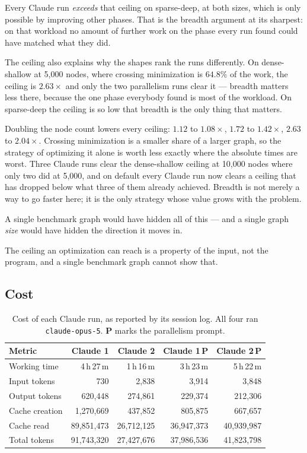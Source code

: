 Every Claude run \emph{exceeds} that ceiling on sparse-deep, at both sizes,
which is only possible by improving other phases. That is the breadth argument
at its sharpest: on that workload no amount of further work on the phase every
run found could have matched what they did.

The ceiling also explains why the shapes rank the runs differently. On
dense-shallow at 5{,}000 nodes, where crossing minimization is $64.8\%$ of the
work, the ceiling is $2.63\times$ and only the two parallelism runs clear it ---
breadth matters less there, because the one phase everybody found is most of the
workload. On sparse-deep the ceiling is so low that breadth is the only thing
that matters.

Doubling the node count lowers every ceiling: $1.12$ to $1.08\times$, $1.72$ to
$1.42\times$, $2.63$ to $2.04\times$. Crossing minimization is a smaller share
of a larger graph, so the strategy of optimizing it alone is worth less exactly
where the absolute times are worst. Three Claude runs clear the dense-shallow
ceiling at 10{,}000 nodes where only two did at 5{,}000, and on default every
Claude run now clears a ceiling that has dropped below what three of them
already achieved. Breadth is not merely a way to go faster here; it is the only
strategy whose value grows with the problem.

A single benchmark graph would have hidden all of this --- and a single graph
\emph{size} would have hidden the direction it moves in.

The ceiling an optimization can reach is a property of the input, not the
program, and a single benchmark graph cannot show that.

\subsection{Cost}

\begin{table}[H]
\centering
\caption{Cost of each Claude run, as reported by its session log. All four ran
\texttt{claude-opus-5}. \textbf{P} marks the parallelism prompt.}
\label{tab:cost-claude}
\small
\begin{tabular}{lrrrr}
\toprule
\textbf{Metric} & \textbf{Claude 1} & \textbf{Claude 2} & \textbf{Claude 1\,P} & \textbf{Claude 2\,P} \\
\midrule
Working time          & 4\,h\,27\,m & 1\,h\,16\,m & 3\,h\,23\,m & 5\,h\,22\,m \\
\midrule
Input tokens          & 730        & 2,838      & 3,914      & 3,848 \\
Output tokens         & 620,448    & 274,861    & 229,374    & 212,306 \\
Cache creation        & 1,270,669  & 437,852    & 805,875    & 667,657 \\
Cache read            & 89,851,473 & 26,712,125 & 36,947,373 & 40,939,987 \\
\midrule
Total tokens          & 91,743,320 & 27,427,676 & 37,986,536 & 41,823,798 \\
\bottomrule
\end{tabular}
\end{table}

